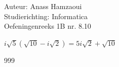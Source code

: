 \documentclass[a4paper]{article}
\begin{document}
  
\noindent \large Auteur: Anass Hamzaoui \\
\noindent \large Studierichting: Informatica\\
\noindent \large Oefeningenreeks 1B nr. 8.10\\

\medskip

\normalsize

$i \sqrt{5}(\sqrt{10} - i\sqrt{2}) = 5i \sqrt{2} + \sqrt{10}$ 


\begin{thebibliography}{999}
\end{thebibliography}
\end{document}
